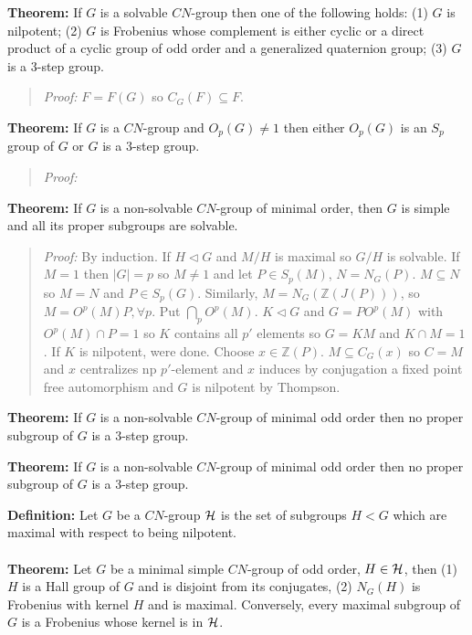 {\bf Theorem:} If $G$ is a solvable $CN$-group then one of the following holds:
(1) $G$ is nilpotent;
(2) $G$ is Frobenius whose complement is either cyclic or a direct product of a cyclic group of
odd order and a generalized quaternion group;
(3) $G$ is a $3$-step group.
\begin{quote}
\emph{Proof:}
$F=F(G)$ so $C_G(F) \subseteq F$.
\end{quote}
{\bf Theorem:} If $G$ is a $CN$-group and $O_p(G) \ne 1$ then either $O_p(G)$ is an $S_p$ group
of $G$ or $G$ is a $3$-step group.
\begin{quote}
\emph{Proof:}
\end{quote}
{\bf Theorem:} If $G$ is a non-solvable $CN$-group of
minimal order, then $G$ is simple and all its proper subgroups are solvable.
\begin{quote}
\emph{Proof:}
By induction.  If $H \lhd G$ and $M/H$ is maximal so $G/H$ is solvable.  If $M=1$ then $|G|=p$ so
$M \ne 1$ and let $P \in S_p(M)$, $N= N_G(P)$.  $M \subseteq N$ so $M=N$ and $P \in S_p(G)$.
Similarly, $M = N_G({\mathbb Z}(J(P)))$, so $M=O^p(M)P, \forall p$.  Put $\bigcap_p O^p(M)$.
$K \lhd G$ and $G = PO^p(M)$ with $O^p(M) \cap P = 1$ so $K$ contains all $p'$ elements
so $G=KM$ and $K \cap M =1$.  If $K$ is nilpotent, were done. Choose $x \in {\mathbb Z}(P)$.
$M \subseteq C_G(x)$ so $C=M$ and $x$ centralizes np $p'$-element and $x$ induces by conjugation
a fixed point free automorphism and $G$ is nilpotent by Thompson.
\end{quote}
{\bf Theorem:} If $G$ is a non-solvable $CN$-group of minimal odd order
then no proper subgroup of $G$ is a $3$-step group.
\begin{quote}
\end{quote}
{\bf Theorem:} If $G$ is a non-solvable $CN$-group of minimal odd order then no proper
subgroup of $G$ is a $3$-step group.
\begin{quote}
\end{quote}
{\bf Definition:}  Let $G$ be a $CN$-group ${\cal H}$ is the set of subgroups $H < G$ which are
maximal with respect to being nilpotent.
\\
\\
{\bf Theorem:} Let $G$ be a minimal simple $CN$-group of odd order, $H \in {\cal H}$, then (1)
$H$ is a Hall group of $G$ and is disjoint from its conjugates, (2) $N_G(H)$ is Frobenius with
kernel $H$ and is maximal.  Conversely, every maximal subgroup of $G$ is a Frobenius whose
kernel is in ${\cal H}$.
\begin{quote}
\end{quote}
